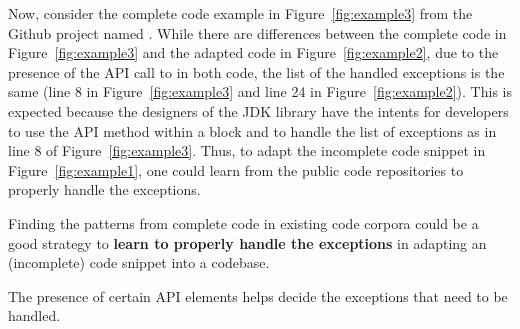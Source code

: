 





Now, consider the complete code example in Figure~\ref{fig:example3}
from the Github project named . While there are
differences between the complete code in Figure~\ref{fig:example3} and
the adapted code in Figure~\ref{fig:example2}, due to the presence of
the API call to  in both code, the list of
the handled exceptions is the same (line 8 in
Figure~\ref{fig:example3} and line 24 in
Figure~\ref{fig:example2}). This is expected because the designers of
the JDK library have the intents for developers to use the API method
 within a  block and to
handle the list of exceptions as in line 8 of
Figure~\ref{fig:example3}. Thus, to adapt the incomplete code snippet
in Figure~\ref{fig:example1}, one could learn from the public code
repositories to properly handle the exceptions.

\begin{Observation} 
\label{ob2}
Finding the patterns from complete code in existing code corpora could
be a good strategy to {\bf learn to properly handle the exceptions} in
adapting an (incomplete) code snippet into a codebase.
\end{Observation}


\begin{Observation} 
\label{ob3}
The presence of certain API elements helps decide the exceptions that
need to be handled.
\end{Observation}

